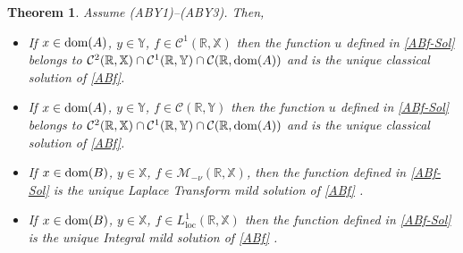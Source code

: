 \documentclass[11pt]{amsart}
\numberwithin{equation}{section}
\newtheorem{theorem}{Theorem}[section]
\theoremstyle{remark}
\theoremstyle{definition}
\newcommand\bX{{\mathbb X}}
\newcommand\bY{{\mathbb Y}}
\newcommand{\dom}{\text{\rm{dom}}}
\begin{document}
\begin{theorem}\label{t5.5}
	Assume \textnormal{(ABY1)--(ABY3)}. Then,
	\begin{itemize}
		\item[(i)] If $x \in \dom(A)$, $y \in \bY$, $f \in \mathcal{C}^1(\mathbb{R}, \bX)$ then the function $u$ defined in \eqref{ABf-Sol} belongs to $\mathcal{C}^2(\mathbb{R}, \bX) \cap \mathcal{C}^1(\mathbb{R}, \bY) \cap \mathcal{C}(\mathbb{R}, \dom(A))$ and is the unique classical solution of \eqref{ABf}.
		\item[(ii)] If $x \in \dom(A)$, $y \in \bY$, $f \in \mathcal{C}(\mathbb{R}, \bY)$ then the function $u$ defined in \eqref{ABf-Sol} belongs to $\mathcal{C}^2(\mathbb{R}, \bX) \cap \mathcal{C}^1(\mathbb{R}, \bY) \cap \mathcal{C}(\mathbb{R}, \dom(A))$ and is the unique classical solution of \eqref{ABf}.
		\item[(iii)] If $x \in \dom(B)$, $y \in \bX$, $f \in \mathcal{M}_{-\nu}(\mathbb{R}, \bX)$, then the function defined in \eqref{ABf-Sol} is the unique Laplace Transform mild solution of \eqref{ABf} .
		\item[(iv)] If $x \in \dom(B)$, $y \in \bX$, $f \in L^1_{\mathrm{loc}}(\mathbb{R}, \bX)$ then the function defined in \eqref{ABf-Sol} is the unique Integral mild solution of \eqref{ABf} .
	\end{itemize}
\end{theorem}
\end{document}

